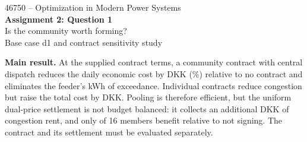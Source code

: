 \documentclass[10pt,a4paper]{article}
\begin{document}
\begin{center}
    {\large 46750 -- Optimization in Modern Power Systems}\\[3pt]
    {\LARGE\bfseries Assignment 2: Question 1}\\[2pt]
    {\large Is the community worth forming?}\\[-1pt]
    {\small Base case d1 and contract sensitivity study}
\end{center}

\noindent\textbf{Main result.} At the supplied contract terms, a community contract with central dispatch reduces the daily economic cost by \Cgain{} DKK (\Cgainpct\%) relative to no contract and eliminates the feeder's \Rex{} kWh of exceedance. Individual contracts reduce congestion but raise the total cost by \Iloss{} DKK. Pooling is therefore efficient, but the uniform dual-price settlement is not budget balanced: it collects an additional \Crent{} DKK of congestion rent, and only \IRR{} of 16 members benefit relative to not signing. The contract and its settlement must be evaluated separately.
\end{document}
